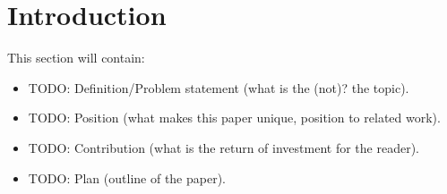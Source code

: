 \documentclass[../main.tex]{subfiles}
\begin{document}
    \section{Introduction}\label{sec:introduction}
    This section will contain:
    \begin{itemize}
        \item TODO: Definition/Problem statement (what is the (not)? the topic).
        \item TODO: Position (what makes this paper unique, position to related work).
        \item TODO: Contribution (what is the return of investment for the reader).
        \item TODO: Plan (outline of the paper).
    \end{itemize}
    
\end{document}

